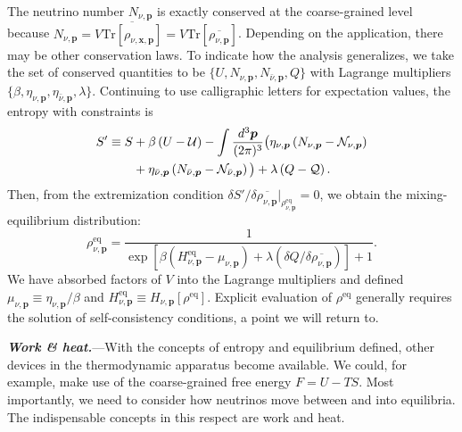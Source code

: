 \documentclass[aps,prl,twocolumn,groupedaddress]{revtex4-2}
\begin{document}
The neutrino number $N_{\nu,\boldsymbol{p}}$ is exactly conserved at the coarse-grained level because $N_{\nu,\boldsymbol{p}} = V \overline{\textrm{Tr}\left[ \rho_{\nu,\boldsymbol{x},\boldsymbol{p}} \right]} = V \textrm{Tr}\left[ \overline{\rho_{\nu, \boldsymbol{p}}} \right]$. Depending on the application, there may be other conservation laws. To indicate how the analysis generalizes, we take the set of conserved quantities to be $\lbrace U, N_{\nu,\boldsymbol{p}}, N_{\bar{\nu},\boldsymbol{p}}, Q \rbrace$ with Lagrange multipliers $\lbrace \beta, \eta_{\nu,\boldsymbol{p}}, \eta_{\bar{\nu},\boldsymbol{p}}, \lambda \rbrace$. Continuing to use calligraphic letters for expectation values, the entropy with constraints is
\begin{align}
S' \equiv S &+ \beta \left( U - \mathcal{U} \right) - \int \frac{d^3 \boldsymbol{p}}{(2\pi)^3} \big( \eta_{\nu,\boldsymbol{p}} \left( N_{\nu,\boldsymbol{p}} - \mathcal{N}_{\nu,\boldsymbol{p}} \right) \notag \\
&+ \eta_{\bar{\nu},\boldsymbol{p}} \left( N_{\bar{\nu},\boldsymbol{p}} - \mathcal{N}_{\bar{\nu},\boldsymbol{p}} \right) \big) + \lambda \left( Q - \mathcal{Q} \right).
\end{align}
Then, from the extremization condition $\delta S' / \delta \overline{\rho_{\nu,\boldsymbol{p}}}|_{\rho^\textrm{eq}_{\nu,\boldsymbol{p}}} = 0$, we obtain the mixing-equilibrium distribution:
\begin{equation}
\rho^\textrm{eq}_{\nu,\boldsymbol{p}} = \frac{1}{\exp \left[ \beta \left( H^\textrm{eq}_{\nu,\boldsymbol{p}} - \mu_{\nu,\boldsymbol{p}}  \right) + \lambda \left( \delta Q / \delta \overline{\rho_{\nu,\boldsymbol{p}}} \right) \right] + 1}. \label{eq:rhoeq}
\end{equation}
We have absorbed factors of $V$ into the Lagrange multipliers and defined $\mu_{\nu,\boldsymbol{p}} \equiv \eta_{\nu,\boldsymbol{p}} / \beta$ and $H^\textrm{eq}_{\nu,\boldsymbol{p}} \equiv H_{\nu,\boldsymbol{p}} [ \rho^\textrm{eq} ]$. Explicit evaluation of $\rho^\textrm{eq}$ generally requires the solution of self-consistency conditions, a point we will return to.










\textbf{\textit{Work \& heat.}}---With the concepts of entropy and equilibrium defined, other devices in the thermodynamic apparatus become available. We could, for example, make use of the coarse-grained free energy $F = U - TS$. Most importantly, we need to consider how neutrinos move between and into equilibria. The indispensable concepts in this respect are work and heat. 
\end{document}
